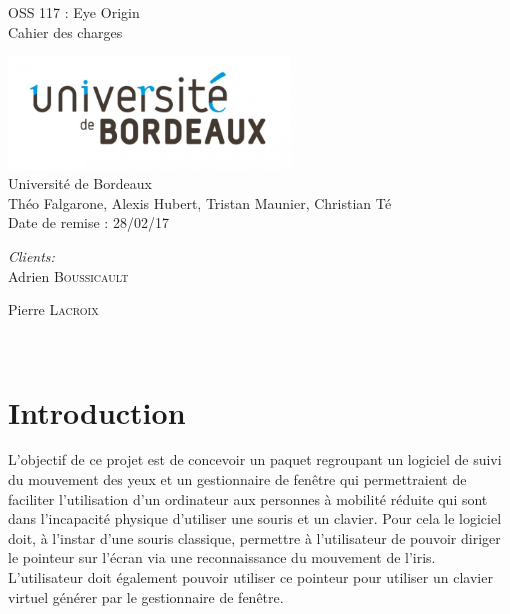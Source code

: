 \documentclass[a4paper, 12pt]{report}
\begin{document}
	\begin{titlepage}
    	\begin{center}
		\vfill
		\Huge{OSS 117 : Eye Origin\\
        Cahier des charges}
		\vfill
		\end{center}
		\begin{center}
	        \centering\includegraphics[height=3cm]{univ.jpg}\hfill \\
	    
		\LARGE{Université de Bordeaux}\\
		 Théo Falgarone, Alexis Hubert, Tristan Maunier, Christian Té \\
        Date de remise : 28/02/17

		\vfill
		\vfill
         \end{center}
                 \begin{minipage}{0.4\textwidth}
\begin{center} \large
\emph{Clients:} \\
Adrien \textsc{Boussicault} %
\par Pierre \textsc{Lacroix} %
\end{center}
\end{minipage}\\[2cm]
	\end{titlepage}
	
    \tableofcontents
    
    \setcounter{page}{0} 
    	
	\chapter*{Introduction} %
L'objectif de ce projet est de concevoir un paquet regroupant un logiciel de suivi du mouvement des yeux et un gestionnaire de fenêtre qui permettraient de faciliter l'utilisation d'un ordinateur aux personnes à mobilité réduite qui sont dans l'incapacité physique d'utiliser une souris et un clavier. Pour cela le logiciel doit, à l'instar d'une souris classique, permettre à l'utilisateur de pouvoir diriger le pointeur sur l'écran via une reconnaissance du mouvement de l'iris. L'utilisateur doit également pouvoir utiliser ce pointeur pour utiliser un clavier virtuel générer par le gestionnaire de fenêtre. \\
\end{document}
